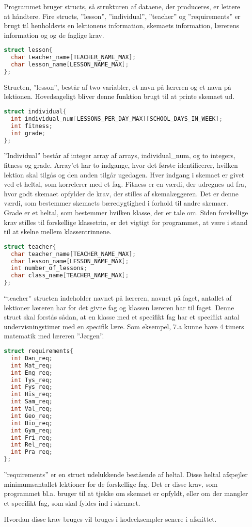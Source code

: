 Programmet bruger structs, så strukturen af dataene, der produceres, er lettere at håndtere. Fire structs, ”lesson”, ”individual”, ”teacher” og ”requirements” er brugt til henholdsvis en lektionens information, skemaets information, lærerens information og og de faglige krav.

\begin{lstlisting}[language = C]
struct lesson{
  char teacher_name[TEACHER_NAME_MAX];
  char lesson_name[LESSON_NAME_MAX];
};
\end{lstlisting}

Structen, ”lesson”, består af two variabler, et navn på læreren og et navn på lektionen. Hovedsageligt bliver denne funktion brugt til at printe skemaet ud.

\begin{lstlisting}[language = C]
struct individual{
  int individual_num[LESSONS_PER_DAY_MAX][SCHOOL_DAYS_IN_WEEK];
  int fitness;
  int grade;
};
\end{lstlisting}

”Individual” består af integer array af arrays, individual\_num, og to integers, fitness og grade. Array’et har to indgange, hvor det første identificerer, hvilken lektion skal tilgås og den anden tilgår ugedagen. Hver indgang i skemaet er givet ved et heltal, som korrelerer med et fag. Fitness er en værdi, der udregnes ud fra, hvor godt skemaet opfylder de krav, der stilles af skemalæggeren. Det er denne værdi, som bestemmer skemaets bæredygtighed i forhold til andre skemaer. Grade er et heltal, som bestemmer hvilken klasse, der er tale om. Siden forskellige krav stilles til forskellige klassetrin, er det vigtigt for programmet, at være i stand til at skelne mellem klassentrinnene.

\begin{lstlisting}[language = C]
struct teacher{
  char teacher_name[TEACHER_NAME_MAX];
  char lesson_name[LESSON_NAME_MAX];
  int number_of_lessons;
  char class_name[TEACHER_NAME_MAX];
};
\end{lstlisting}

“teacher” structen indeholder navnet på læreren, navnet på faget, antallet af lektioner læreren har for det givne fag og klassen læreren har til faget. Denne struct skal forstås sådan, at en klasse med et specifikt fag har et specifikt antal undervisningstimer med en specifik lære. Som eksempel, 7.a kunne have 4 timers matematik med læreren ”Jørgen”. 

\begin{lstlisting}[language = C]
struct requirements{
  int Dan_req;
  int Mat_req;
  int Eng_req;
  int Tys_req;
  int Fys_req;
  int His_req;
  int Sam_req;
  int Val_req;
  int Geo_req;
  int Bio_req;
  int Gym_req;
  int Fri_req;
  int Rel_req;
  int Pra_req;
};
\end{lstlisting}

”requirements” er en struct udelukkende bestående af heltal. Disse heltal afspejler minimumsantallet lektioner for de forskellige fag. Det er disse krav, som programmet bl.a. bruger til at tjekke om skemaet er opfyldt, eller om der mangler et specifikt fag, som skal fyldes ind i skemaet.

Hvordan disse krav bruges vil bruges i kodeeksempler senere i afsnittet.

